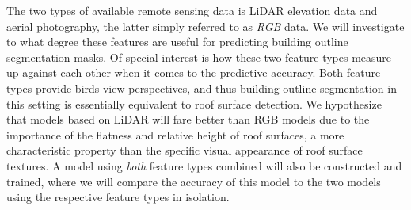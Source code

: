 The two types of available remote sensing data is LiDAR elevation data and aerial photography, the latter simply referred to as \textit{RGB} data.
We will investigate to what degree these features are useful for predicting building outline segmentation masks.
Of special interest is how these two feature types measure up against each other when it comes to the predictive accuracy.
Both feature types provide birds-view perspectives, and thus building outline segmentation in this setting is essentially equivalent to roof surface detection.
We hypothesize that models based on LiDAR will fare better than RGB models due to the importance of the flatness and relative height of roof surfaces, a more characteristic property than the specific visual appearance of roof surface textures.
A model using \textit{both} feature types combined will also be constructed and trained, where we will compare the accuracy of this model to the two models using the respective feature types in isolation.
